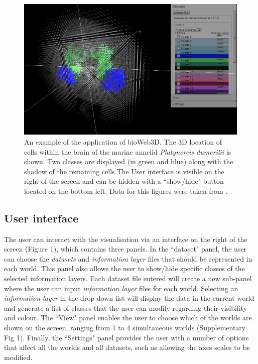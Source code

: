 \documentclass{bioinfo}
\begin{document}
\begin{figure}[h!]%
\centerline{\includegraphics[totalheight=0.2\textheight]{fig1.png}}
\caption{An example of the application of bioWeb3D. The 3D location of cells within the brain of the marine annelid {\it{Platynereis dumerilii}} is shown. Two classes are displayed (in green and blue) along with the shadow of the remaining cells.The User interface is visible on the right of the screen and can be hidden with a ``show/hide" button located on the bottom left. Data for this figures were taken from \citep{Tomer10}.}\label{fig:01}
\end{figure}

\subsection{User interface}
The user can interact with the visualisation via an interface on the right of the screen (Figure 1), which contains three panels. In the ``dataset" panel, the user can choose the {\it{datasets}} and {\it{information layer}} files that should be represented in each world. This panel also allows the user to show/hide specific classes of the selected information layers. Each dataset file entered will create a new sub-panel where the user can input {\it{information layer}} files for each world. Selecting an {\it{information layer}} in the drop-down list will display the data in the current world and generate a list of classes that the user can modify regarding their visibility and colour. The ``View" panel enables the user to choose which of the worlds are shown on the screen, ranging from 1 to 4 simultaneous worlds (Supplementary Fig 1). Finally, the ``Settings" panel provides the user with a number of options that affect all the worlds and all datasets, such as allowing the axes scales to be modified.
\end{document}
